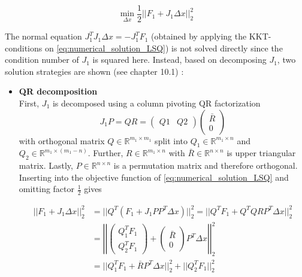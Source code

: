 \documentclass{scrartcl}[12pt, halfparskip]
\numberwithin{equation}{section}
\numberwithin{figure}{section}
\numberwithin{table}{section}
\begin{document}
\begin{equation}
\min_{\Delta x} \frac{1}{2} || F_1 + J_1 \Delta x ||_2^2
\label{eq:numerical_solution_LSQ}
\end{equation}

The normal equation $J_1^T J_1 \Delta x = -J_1^T F_1$ (obtained by applying the KKT-conditions on \cref{eq:numerical_solution_LSQ}) is not solved directly since the condition number of $J_1$ is squared here.
Instead, based on decomposing $J_1$, two solution strategies are shown (see \cite{nonlinear_optimiziation_wright} chapter 10.1) :

\begin{itemize}
	\item \textbf{QR decomposition} \\
	First, $J_1$ is decomposed using a column pivoting QR factorization
	\begin{equation}
		J_1 P = Q R = 
		\begin{pmatrix}
			Q1 & Q2
		\end{pmatrix}
		\begin{pmatrix}
			\bar{R} \\
			0
		\end{pmatrix}
	\end{equation}
	with orthogonal matrix $Q \in \mathbb{R}^{m_1 \times m_1}$ split into $Q_1 \in \mathbb{R}^{m_1 \times n}$ and $Q_2 \in \mathbb{R}^{m_1 \times (m_1-n)}$. Further, $R \in \mathbb{R}^{m_1 \times n}$ with $\bar{R} \in \mathbb{R}^{n \times n}$ is upper triangular matrix. Lastly, $P \in \mathbb{R}^{n \times n}$ is a permutation matrix and therefore orthogonal. Inserting into the objective function of \cref{eq:numerical_solution_LSQ} and omitting factor $\frac{1}{2}$ gives
	
	\begin{align}
		|| F_1 + J_1 \Delta x ||_2^2 & = || Q^T (F_1 + J_1 P P^T \Delta x) ||_2^2 = || Q^T F_1 + Q^T Q R P^T \Delta x ||_2^2 \\
		& = \left| \left| \begin{pmatrix}
		Q_1^T F_1 \\
		Q_2^T F_1
		\end{pmatrix} + 
		\begin{pmatrix}
		\bar{R} \\
		0
		\end{pmatrix}
		P^T \Delta x \right| \right|_2^2 \nonumber \\
		& = || Q_1^T F_1 + \bar{R} P^T \Delta x ||_2^2 + ||Q_2^T F_1 ||_2^2 \nonumber
	\end{align}
	

\end{itemize}
\end{document}

